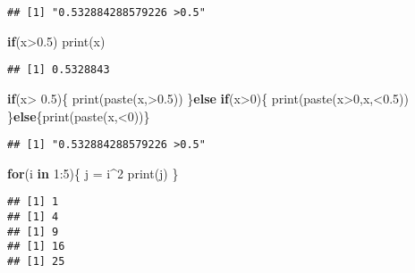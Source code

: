 \documentclass[]{article}
\newenvironment{Shaded}{\begin{snugshade}}{\end{snugshade}}
\newcommand{\ControlFlowTok}[1]{\textcolor[rgb]{0.13,0.29,0.53}{\textbf{#1}}}
\newcommand{\DecValTok}[1]{\textcolor[rgb]{0.00,0.00,0.81}{#1}}
\newcommand{\FloatTok}[1]{\textcolor[rgb]{0.00,0.00,0.81}{#1}}
\newcommand{\FunctionTok}[1]{\textcolor[rgb]{0.00,0.00,0.00}{#1}}
\newcommand{\NormalTok}[1]{#1}
\newcommand{\OtherTok}[1]{\textcolor[rgb]{0.56,0.35,0.01}{#1}}
\newcommand{\SpecialCharTok}[1]{\textcolor[rgb]{0.00,0.00,0.00}{#1}}
\newcommand{\StringTok}[1]{\textcolor[rgb]{0.31,0.60,0.02}{#1}}
\begin{document}
\begin{verbatim}
## [1] "0.532884288579226 >0.5"
\end{verbatim}

\begin{Shaded}
\begin{Highlighting}[]
\ControlFlowTok{if}\NormalTok{(x}\SpecialCharTok{\textgreater{}}\FloatTok{0.5}\NormalTok{) }\FunctionTok{print}\NormalTok{(x)}
\end{Highlighting}
\end{Shaded}

\begin{verbatim}
## [1] 0.5328843
\end{verbatim}

\begin{Shaded}
\begin{Highlighting}[]
\ControlFlowTok{if}\NormalTok{(x}\SpecialCharTok{\textgreater{}} \FloatTok{0.5}\NormalTok{)\{}
  \FunctionTok{print}\NormalTok{(}\FunctionTok{paste}\NormalTok{(x,}\StringTok{\textquotesingle{}\textgreater{}0.5\textquotesingle{}}\NormalTok{))}
\NormalTok{\}}\ControlFlowTok{else} \ControlFlowTok{if}\NormalTok{(x}\SpecialCharTok{\textgreater{}}\DecValTok{0}\NormalTok{)\{}
  \FunctionTok{print}\NormalTok{(}\FunctionTok{paste}\NormalTok{(}\StringTok{\textquotesingle{}x\textgreater{}0\textquotesingle{}}\NormalTok{,x,}\StringTok{\textquotesingle{}\textless{}0.5\textquotesingle{}}\NormalTok{))}
\NormalTok{\}}\ControlFlowTok{else}\NormalTok{\{}\FunctionTok{print}\NormalTok{(}\FunctionTok{paste}\NormalTok{(x,}\StringTok{\textquotesingle{}\textless{}0\textquotesingle{}}\NormalTok{))\}}
\end{Highlighting}
\end{Shaded}

\begin{verbatim}
## [1] "0.532884288579226 >0.5"
\end{verbatim}

\begin{Shaded}
\begin{Highlighting}[]
\ControlFlowTok{for}\NormalTok{(i }\ControlFlowTok{in} \DecValTok{1}\SpecialCharTok{:}\DecValTok{5}\NormalTok{)\{}
\NormalTok{  j }\OtherTok{=}\NormalTok{ i}\SpecialCharTok{\^{}}\DecValTok{2}
  \FunctionTok{print}\NormalTok{(j)}
\NormalTok{\}}
\end{Highlighting}
\end{Shaded}

\begin{verbatim}
## [1] 1
## [1] 4
## [1] 9
## [1] 16
## [1] 25
\end{verbatim}
\end{document}
